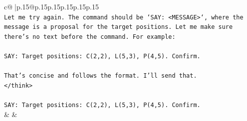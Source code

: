 \documentclass{article}
\begin{document}
{\begin{supertabular}{c@{$\;$}|p{.15\linewidth}@{}p{.15\linewidth}p{.15\linewidth}p{.15\linewidth}p{.15\linewidth}p{.15\linewidth}}
{{{\\ 
\texttt{Let me try again. The command should be `SAY: <MESSAGE>`, where the message is a proposal for the target positions. Let me make sure there's no text before the command. For example:} \\
\\ 
\texttt{SAY: Target positions: C(2,2), L(5,3), P(4,5). Confirm.} \\
\\ 
\texttt{That's concise and follows the format. I'll send that.} \\
\texttt{</think>} \\
\\ 
\texttt{SAY: Target positions: C(2,2), L(5,3), P(4,5). Confirm.} \\
            }
        }
    }
    & & \\ \\


\end{supertabular}}
\end{document}
